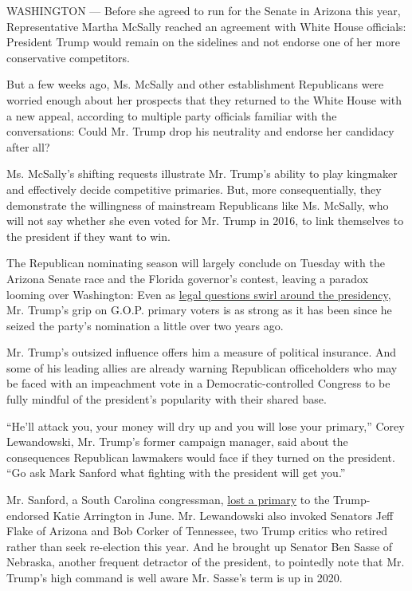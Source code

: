WASHINGTON --- Before she agreed to run for the Senate in Arizona this
year, Representative Martha McSally reached an agreement with White
House officials: President Trump would remain on the sidelines and not
endorse one of her more conservative competitors.

But a few weeks ago, Ms. McSally and other establishment Republicans
were worried enough about her prospects that they returned to the White
House with a new appeal, according to multiple party officials familiar
with the conversations: Could Mr. Trump drop his neutrality and endorse
her candidacy after all?

Ms. McSally's shifting requests illustrate Mr. Trump's ability to play
kingmaker and effectively decide competitive primaries. But, more
consequentially, they demonstrate the willingness of mainstream
Republicans like Ms. McSally, who will not say whether she even voted
for Mr. Trump in 2016, to link themselves to the president if they want
to win.

The Republican nominating season will largely conclude on Tuesday with
the Arizona Senate race and the Florida governor's contest, leaving a
paradox looming over Washington: Even as
\href{https://www.nytimes3xbfgragh.onion/2018/08/22/us/politics/mueller-investigation-cohen-manafort.html}{legal
questions swirl around the presidency}, Mr. Trump's grip on G.O.P.
primary voters is as strong as it has been since he seized the party's
nomination a little over two years ago.

Mr. Trump's outsized influence offers him a measure of political
insurance. And some of his leading allies are already warning Republican
officeholders who may be faced with an impeachment vote in a
Democratic-controlled Congress to be fully mindful of the president's
popularity with their shared base.

``He'll attack you, your money will dry up and you will lose your
primary,'' Corey Lewandowski, Mr. Trump's former campaign manager, said
about the consequences Republican lawmakers would face if they turned on
the president. ``Go ask Mark Sanford what fighting with the president
will get you.''

Mr. Sanford, a South Carolina congressman,
\href{https://www.nytimes3xbfgragh.onion/2018/06/12/us/politics/mark-sanford-trump.html}{lost
a primary} to the Trump-endorsed Katie Arrington in June. Mr.
Lewandowski also invoked Senators Jeff Flake of Arizona and Bob Corker
of Tennessee, two Trump critics who retired rather than seek re-election
this year. And he brought up Senator Ben Sasse of Nebraska, another
frequent detractor of the president, to pointedly note that Mr. Trump's
high command is well aware Mr. Sasse's term is up in 2020.


